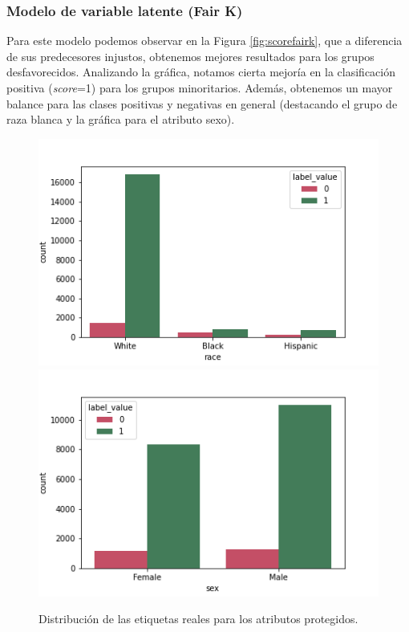\documentclass[oneside,openright,titlepage,numbers=noenddot,openany,headinclude,footinclude=true,
cleardoublepage=empty,abstractoff,BCOR=5mm,paper=a4,fontsize=12pt,main=spanish]{scrreprt}
\begin{document}
\subsubsection*{Modelo de variable latente (Fair K)}

Para este modelo podemos observar en la Figura \ref{fig:scorefairk}, que a diferencia de sus predecesores injustos, obtenemos mejores resultados para los grupos desfavorecidos. Analizando la gráfica, notamos cierta mejoría en la clasificación positiva (\textit{score}=1) para los grupos minoritarios. Además, obtenemos un mayor balance para las clases positivas y negativas en general (destacando el grupo de raza blanca y la gráfica para el atributo sexo).\\

\begin{figure}[H]
      \includegraphics[width=\linewidth]{images/label_race_law_2.png}
    \endminipage\hfill
      \includegraphics[width=\linewidth]{images/label_sex_law_2.png}
    \endminipage
     \caption{Distribución de las etiquetas reales para los atributos protegidos.}
     \label{fig:labelracesex2}
\end{figure}
\end{document}
